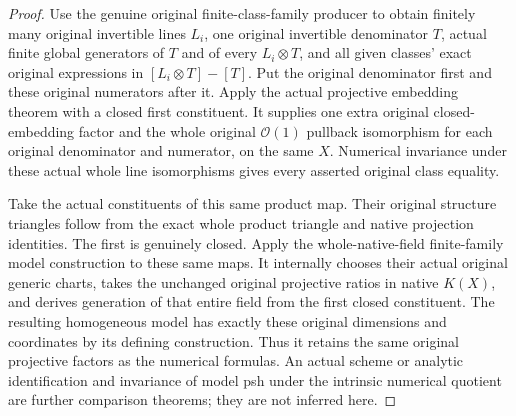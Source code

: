 \begin{proof}
Use the genuine original finite-class-family producer to
obtain finitely many original invertible lines $L_i$, one
original invertible denominator $T$, actual finite global
generators of $T$ and of every $L_i\otimes T$, and all given
classes' exact original expressions in
$[L_i\otimes T]-[T]$. Put the original denominator first and
these original numerators after it. Apply the actual
projective embedding theorem with a closed first constituent.
It supplies one extra original closed-embedding factor and
the whole original $\mathcal O(1)$ pullback isomorphism for
each original denominator and numerator, on the same $X$.
Numerical invariance under these actual whole line
isomorphisms gives every asserted original class equality.

Take the actual constituents of this same product map.
Their original structure triangles follow from the exact
whole product triangle and native projection identities.
The first is genuinely closed. Apply the whole-native-field
finite-family model construction to these same maps.
It internally chooses their actual original generic charts,
takes the unchanged original projective ratios in native
$K(X)$, and derives generation of that entire field from the
first closed constituent. The resulting homogeneous model
has exactly these original dimensions and coordinates by
its defining construction. Thus it retains the same original
projective factors as the numerical formulas. An actual
scheme or analytic identification and invariance of model
psh under the intrinsic numerical quotient are further
comparison theorems; they are not inferred here.
\end{proof}
